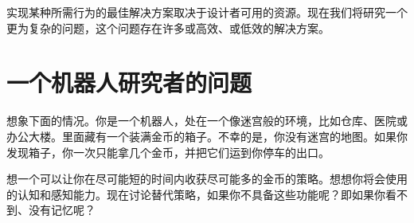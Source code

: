 
实现某种所需行为的最佳解决方案取决于设计者可用的资源。现在我们将研究一个更为复杂的问题，这个问题存在许多或高效、或低效的解决方案。


\section{一个机器人研究者的问题}
想象下面的情况。你是一个机器人，处在一个像迷宫般的环境，比如仓库、医院或办公大楼。里面藏有一个装满金币的箱子。不幸的是，你没有迷宫的地图。如果你发现箱子，你一次只能拿几个金币，并把它们运到你停车的出口。


\begin{framed}
想一个可以让你在尽可能短的时间内收获尽可能多的金币的策略。想想你将会使用的认知和感知能力。现在讨论替代策略，如果你不具备这些功能呢？即如果你看不到、没有记忆呢？
\end{framed}



